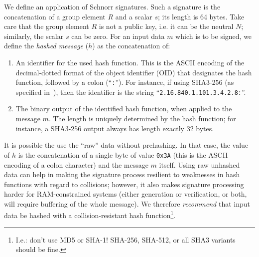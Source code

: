 \documentclass{llncs}
\begin{document}
We define an application of Schnorr signatures. Such a signature is the
concatenation of a group element $R$ and a scalar $s$; its length is 64
bytes. Take care that the group element $R$ is not a public key, i.e. it
can be the neutral $N$; similarly, the scalar $s$ can be zero. For an
input data $m$ which is to be signed, we define the \emph{hashed
message} ($h$) as the concatenation of:
\begin{enumerate}

    \item An identifier for the used hash function. This is the ASCII
    encoding of the decimal-dotted format of the object identifier (OID)
    that designates the hash function, followed by a colon
    (``\verb+:+''). For instance, if using SHA3-256 (as specified
    in~\cite{Fips202}), then the identifier is the string
    ``\verb+2.16.840.1.101.3.4.2.8:+''.

    \item The binary output of the identified hash function, when
    applied to the message $m$. The length is uniquely determined by the
    hash function; for instance, a SHA3-256 output always has length
    exactly 32 bytes.

\end{enumerate}
It is possible the use the ``raw'' data without prehashing. In that
case, the value of $h$ is the concatenation of a single byte of value
\verb+0x3A+ (this is the ASCII encoding of a colon character) and the
message $m$ itself. Using raw unhashed data can help in making the
signature process resilient to weaknesses in hash functions with regard
to collisions; however, it also makes signature processing harder for
RAM-constrained systems (either generation or verification, or both,
will require buffering of the whole message). We therefore
\emph{recommend} that input data be hashed with a collision-resistant
hash function\footnote{I.e.: don't use MD5 or SHA-1! SHA-256, SHA-512,
or all SHA3 variants should be fine.}.
\end{document}
